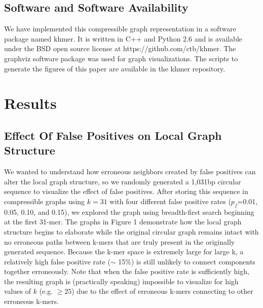 \documentclass[12pt]{article} \usepackage{simplemargins}
\begin{document}
\subsection{Software and Software Availability}
We have implemented this compressible graph representation in a software package
named khmer.
It is written in C++
and Python 2.6 and is available under the BSD open source license at
https://github.com/ctb/khmer.
The graphviz software 
package was used for graph visualizations. The scripts to 
generate the figures of this paper are available in the khmer repository.

\section{Results}

\subsection{Effect Of False Positives on Local Graph Structure}
We wanted to understand how erroneous neighbors created 
by false positives can alter 
the local graph structure, so we randomly generated a 1,031bp circular sequence 
to visualize the effect of false positives.
After storing this sequence in compressible graphs using $k=31$ with
four different false positive rates ($p_f$=0.01, 0.05, 0.10, and
0.15), we explored the graph using breadth-first search beginning at
the first 31-mer. 
The graphs in Figure 
1 demonstrate how
the local graph structure begins to elaborate while the original circular
graph remains intact with no erroneous paths between k-mers that are
truly present in the originally generated sequence. Because the k-mer
space is extremely large for large k, a relatively high false positive 
rate ($\sim$ 15\%) is still 
unlikely to connect components
together erroneously. Note that when the false positive
rate is sufficiently high, the resulting graph is 
(practically speaking) impossible to visualize for high values of $k$ (e.g. $\ge 25$) 
due to the effect of erroneous k-mers connecting to other erroneous k-mers. 
\end{document}
